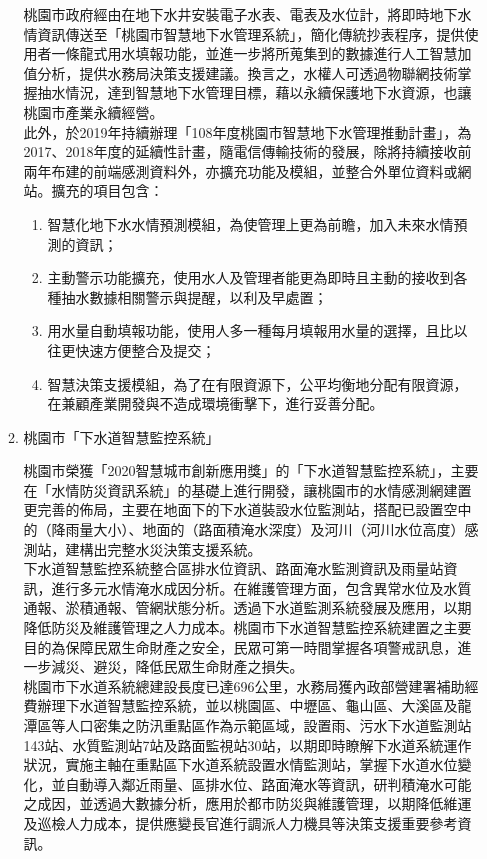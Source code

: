 \documentclass[a4paper,12pt]{article}
\begin{document}
\begin{enumerate}
\begin{enumerate}
桃園市政府經由在地下水井安裝電子水表、電表及水位計，將即時地下水情資訊傳送至「桃園市智慧地下水管理系統」，簡化傳統抄表程序，提供使用者一條龍式用水填報功能，並進一步將所蒐集到的數據進行人工智慧加值分析，提供水務局決策支援建議。換言之，水權人可透過物聯網技術掌握抽水情況，達到智慧地下水管理目標，藉以永續保護地下水資源，也讓桃園市產業永續經營。\\

此外，於2019年持續辦理「108年度桃園市智慧地下水管理推動計畫」，為2017、2018年度的延續性計畫，隨電信傳輸技術的發展，除將持續接收前兩年布建的前端感測資料外，亦擴充功能及模組，並整合外單位資料或網站。擴充的項目包含：\\
\begin{enumerate}
\item 智慧化地下水水情預測模組，為使管理上更為前瞻，加入未來水情預測的資訊；\\
\item 主動警示功能擴充，使用水人及管理者能更為即時且主動的接收到各種抽水數據相關警示與提醒，以利及早處置；\\
\item 用水量自動填報功能，使用人多一種每月填報用水量的選擇，且比以往更快速方便整合及提交；\\
\item 智慧決策支援模組，為了在有限資源下，公平均衡地分配有限資源，在兼顧產業開發與不造成環境衝擊下，進行妥善分配。\\
\end{enumerate}
\item 桃園市「下水道智慧監控系統」
\label{sec:orgd80398c}

桃園市榮獲「2020智慧城市創新應用獎」的「下水道智慧監控系統」，主要在「水情防災資訊系統」的基礎上進行開發，讓桃園市的水情感測網建置更完善的佈局，主要在地面下的下水道裝設水位監測站，搭配已設置空中的（降雨量大小）、地面的（路面積淹水深度）及河川（河川水位高度）感測站，建構出完整水災決策支援系統。\\

下水道智慧監控系統整合區排水位資訊、路面淹水監測資訊及雨量站資訊，進行多元水情淹水成因分析。在維護管理方面，包含異常水位及水質通報、淤積通報、管網狀態分析。透過下水道監測系統發展及應用，以期降低防災及維護管理之人力成本。桃園市下水道智慧監控系統建置之主要目的為保障民眾生命財產之安全，民眾可第一時間掌握各項警戒訊息，進一步減災、避災，降低民眾生命財產之損失。\\

桃園市下水道系統總建設長度已達696公里，水務局獲內政部營建署補助經費辦理下水道智慧監控系統，並以桃園區、中壢區、龜山區、大溪區及龍潭區等人口密集之防汛重點區作為示範區域，設置雨、污水下水道監測站143站、水質監測站7站及路面監視站30站，以期即時瞭解下水道系統運作狀況，實施主軸在重點區下水道系統設置水情監測站，掌握下水道水位變化，並自動導入鄰近雨量、區排水位、路面淹水等資訊，研判積淹水可能之成因，並透過大數據分析，應用於都市防災與維護管理，以期降低維運及巡檢人力成本，提供應變長官進行調派人力機具等決策支援重要參考資訊。\\


\end{enumerate}
\end{enumerate}
\end{document}
